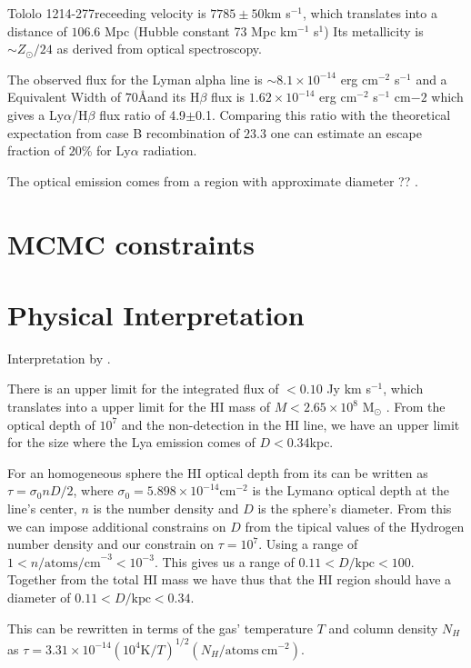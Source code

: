 \documentclass[a4paper, usenatbib, 12pt]{article}
\newcommand{\tol}{Tololo 1214-277}
\begin{document}
{\tol receeding velocity is $7785\pm 50$km s$^{-1}$, which translates
into a distance of $106.6$ Mpc (Hubble constant 73 Mpc km$^{-1}$
s$^{1}$)
Its metallicity is $\sim Z_{\odot}/24$ \cite{Izotov04} as derived from optical
spectroscopy. 

The observed flux for the Lyman alpha line is $\sim
8.1\times 10^{-14}$ erg cm$^{-2}$ s$^{-1}$ \cite{Thuan97}
and a Equivalent Width of $70$\AA and its H$\beta$ flux is 
$1.62\times 10^{-14}$ erg cm$^{-2}$ s$^{-1}$ cm${-2}$
\cite{Izotov04} which gives a Ly$\alpha$/H$\beta$ flux ratio of
4.9$\pm$0.1. 
Comparing this ratio with the theoretical expectation from case B
recombination of $23.3$ \cite{Hummer1987} one can estimate an escape
fraction of $20$\% for Ly$\alpha$ radiation.

The optical emission  comes from a   region with approximate diameter
?? \cite{Fricke01}. 

\section*{MCMC constraints}

\section*{Physical Interpretation}

Interpretation by \cite{mashesse03}.

There is an upper limit for the  
integrated flux of $<0.10$ Jy km s$^{-1}$, which translates into a
upper limit for the HI mass of $M<2.65\times 10^{8}$ M$_{\odot}$
\cite{pustilnikmartin07}. 
From the optical depth of $10^7$ and the non-detection in the HI line,
we have an upper limit for the size where the Lya emission comes of
$D<0.34$kpc. 

 For an homogeneous sphere the HI optical depth from its can be
 written as $\tau = \sigma_0 n D/2$, where $\sigma_0=5.898\times
10^{-14}$cm$^{-2}$ is the Lyman$\alpha$  optical depth at the 
line's center, $n$ is the number density and $D$ is the sphere's
diameter. 
From this we can impose additional constrains on $D$ from the tipical
values of the Hydrogen number density and our constrain on
$\tau=10^{7}$.  Using a range of $1<n/\mathrm{atoms/cm}^{-3} <
10^{-3}$. This gives us a range of $0.11 < D/\mathrm{kpc}<100$. 
Together from the total HI mass we have thus that the HI region should
have a diameter of $0.11 < D/\mathrm{kpc}<0.34$.



This can be rewritten in terms of the gas' temperature $T$ and column
density $N_{H}$as $\tau = 3.31 \times 10^{-14} (10^{4}\mathrm{K}/T)^{1/2}
(N_{H}/\mathrm{atoms\ cm}^{-2})$.  

}
\end{document}
